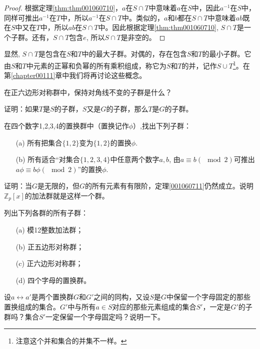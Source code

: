 \begin{proof}
根据定理\ref{thm:thm001060710}，$a$在$S \cap T$中意味着$a$在$S$中，因此$a^{-1}$在$S$中，同样可推出$a^{-1}$在$T$中，所以$a^{-1}$在$S \cap T$中。类似的，$a$和$b$都在$S \cap T$中意味着$ab$既在$S$中又在$T$中，所以$ab$在$S \cap T$中。因此根据定理\ref{thm:thm001060710}, $S \cap T$是一个子群。还有，$S \cap T$包含$e$, 所以$S \cap T$是非空的。
\end{proof}

显然, $S \cap T$是包含在$S$和$T$中的最大子群。对偶的，存在包含$S$和$T$的最小子群。它由$S$和$T$中元素的正幂和负幂的所有乘积组成，称它为$S$和$T$的并，记作$S \cup T$\footnote{注意这个并和集合的并集不一样。}。在第\ref{chapter00111}章中我们将再讨论这些概念。

\begin{problemset}
\item 在正六边形对称群中，保持对角线不变的子群是什么？

\item 证明：如果$T$是$S$的子群，$S$又是$G$的子群，那么$T$是$G$的子群。

\item 在四个数字1,2,3,4的置换群中（置换记作$\phi$）,找出下列子群：
\begin{enumerate}
\item[(a)] 所有把集合$\{1,2\}$变为$\{1,2\}$的置换$\phi$.
\item[(b)] 所有适合“对集合$\{1,2,3,4\}$中任意两个数字$a,b$, 由$a \equiv b(\mod{2})$可推出$a\phi \equiv b\phi(\mod{2})$”的置换$\phi$.
\end{enumerate}

\item 证明：当$G$是无限的，但$G$的所有元素有有限阶，定理\ref{001060711}仍然成立。说明$\mathbb{Z}_p[x]$的加法群就是这样一个群。

\item 列出下列各群的所有子群：
\begin{enumerate}
\item[(a)] 模12整数加法群；
\item[(b)] 正五边形对称群；
\item[(c)] 正六边形对称群；
\item[(d)] 四个字母的置换群。
\end{enumerate}

\item 设$a \leftrightarrow a'$是两个置换群$G$和$G'$之间的同构，又设$S$是$G$中保留一个字母固定的那些置换组成的集合。$G'$中与所有$a \in S$对应的那些元素组成的集合$S'$，一定是$G'$的子群吗？集合$S'$一定保留一个字母固定吗？说明一下。


\end{problemset}
